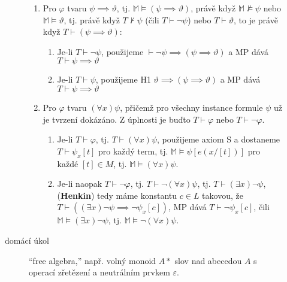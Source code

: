\documentclass[a4paper]{article}
\begin{document}
\begin{description}
\begin{description}
\begin{enumerate}
						\item Pro $\varphi$ tvaru $\psi \implies \vartheta$, tj.
							$\mathbb{M} \models (\psi \implies \vartheta)$, právě když
							$\mathbb{M} \not \models \psi$ nebo $\mathbb{M} \models \vartheta$,
							tj. právě když $T \not \vdash \psi$ (čili $T \vdash \neg \psi$)
							nebo $T \vdash \vartheta$, to je právě když
							$T \vdash (\psi \implies \vartheta)$:
							\begin{enumerate}
								\item Je-li $T \vdash \neg \psi$, použijeme
									$\vdash \neg \psi \implies (\psi \implies \vartheta)$ a MP
									dává $T \vdash \psi \implies \vartheta$
								\item Je-li $T \vdash \psi$, použijeme H1
									$\vartheta \implies (\psi \implies \vartheta)$ a MP
									dává $T \vdash \psi \implies \vartheta$
							\end{enumerate}
						\item Pro $\varphi$ tvaru $(\forall x) \psi$, přičemž pro všechny
							instance formule  $\psi$ už je tvrzení dokázáno.
							Z úplnosti je buďto $T \vdash \varphi$ nebo $T \vdash \neg \varphi$.
							\begin{enumerate}
								\item Je-li $T \vdash \varphi$, tj. $T \vdash (\forall x) \psi$,
								použijeme axiom S a dostaneme $T \vdash \psi_x[t]$ pro každý term,
								tj. $\mathbb{M} \models \psi[e(x/[t])]$ pro každé $[t] \in M$,
								tj. $\mathbb{M} \models (\forall x) \psi$.
								\item Je-li naopak $T \vdash \neg \varphi$, tj.
									$T \vdash \neg (\forall x) \psi$, tj.
									$T \vdash (\exists x) \neg \psi$, (\textbf{Henkin}) tedy
									máme konstantu $c \in L$ takovou, že
									$T \vdash ((\exists x) \neg \psi \implies \neg \psi_x[c])$,
									MP dává $T \vdash \neg \psi_x[c]$, čili
									$\mathbb{M} \models (\exists x) \neg \psi$, tj.
									$\mathbb{M} \models \neg (\forall x) \psi$.
							\end{enumerate}
					\end{enumerate}
				\item[domácí úkol] \enquote{free algebra,} např. volný monoid $A*$ slov
					nad abecedou $A$ s operací zřetězení a neutrálním prvkem $\varepsilon$.
			\end{description}
	\end{description}
\end{document}

